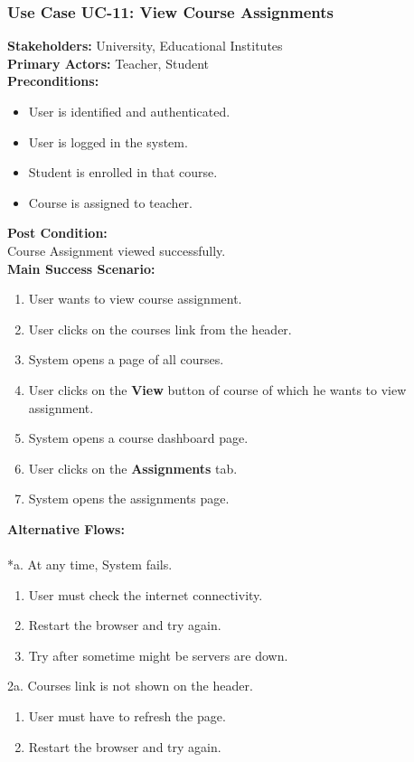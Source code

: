 \documentclass[12pt]{article}
\begin{document}
\subsubsection{Use Case UC-11: View Course Assignments}
\textbf{Stakeholders: } University, Educational Institutes \\
\textbf{Primary Actors: }Teacher, Student \\
\textbf{Preconditions:}
\begin{itemize}
\item User is identified and authenticated.
\item User is logged in the system.
\item Student is enrolled in that course.
\item Course is assigned to teacher.
\end{itemize}
\textbf{Post Condition: }\\
Course Assignment viewed successfully.\\
\textbf{Main Success Scenario:}
\begin{enumerate}
\item User wants to view course assignment.
\item User clicks on the courses link from the header.
\item System opens a page of all courses.
\item User clicks on the \textbf{View} button of course of which he wants to view assignment.
\item System opens a course dashboard page.
\item User clicks on the \textbf{Assignments} tab.
\item System opens the assignments page.
\end{enumerate}
\textbf{Alternative Flows:}\\
\\
*a. At any time, System fails.
\begin{enumerate}
\item User must check the internet connectivity.
\item Restart the browser and try again.
\item Try after sometime might be servers are down.
\end{enumerate}
2a. Courses link is not shown on the header.
\begin{enumerate}
\item User must have to refresh the page.
\item Restart the browser and try again.
\end{enumerate} 
\end{document}
